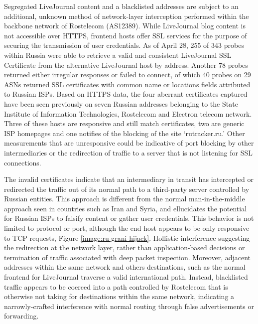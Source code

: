 Segregated LiveJournal content and a blacklisted addresses are subject to an additional, unknown method of network-layer interception performed within the backbone network of Rostelecom (AS12389). While LiveJournal blog content is not accessible over HTTPS, frontend hosts offer SSL services for the purpose of securing the transmission of user credentials. As of April 28, 255 of 343 probes within Russia were able to retrieve a valid and consistent LiveJournal SSL Certificate from the alternative LiveJournal host by address. Another 78 probes returned either irregular responses or failed to connect, of which 40 probes on 29 ASNs returned SSL certificates with common name or locations fields attributed to Russian ISPs. Based on HTTPS data, the four aberrant certificates captured have been seen previously on seven Russian addresses belonging to the State Institute of Information Technologies, Rostelecom and Electron telecom network. Three of these hosts are responsive and still match certificates, two are generic ISP homepages and one notifies of the blocking of the site `rutracker.ru.' Other measurements that are unresponsive could be indicative of port blocking by other intermediaries or the redirection of traffic to a server that is not listening for SSL connections.

The invalid certificates indicate that an intermediary in transit has intercepted or redirected the traffic out of its normal path to a third-party server controlled by Russian entities. This approach is different from the normal man-in-the-middle approach seen in countries such as Iran and Syria, and ellucidates the potential for Russian ISPs to falsify content or gather user credentials. This behavior is not limited to protocol or port, although the end host appears to be only responsive to TCP requests, Figure \ref{image:ru-grani-hijack}. Hollistic interference suggesting the redirection at the network layer, rather than application-based decisions or termination of traffic associated with deep packet inspection. Moreover, adjacent addresses within the same network and others destinations, such as the normal frontend for LiveJournal traverse a valid international path. Instead, blacklisted traffic appears to be coerced into a path controlled by Rostelecom that is otherwise not taking for destinations within the same network, indicating a narrowly-crafted interference with normal routing through false advertisements or forwarding.
